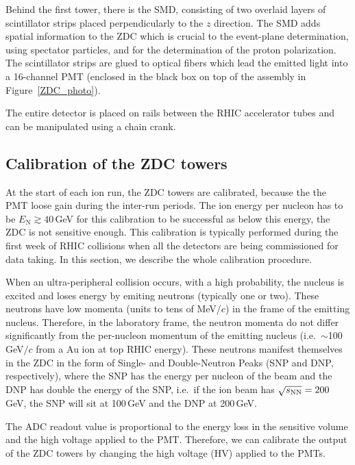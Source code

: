 Behind the first tower, there is the SMD, consisting of two overlaid layers of scintillator strips placed perpendicularly to the $z$ direction. The SMD adds spatial information to the ZDC which is crucial to the event-plane determination, using spectator particles, and for the determination of the proton polarization\@. The scintillator strips are glued to optical fibers which lead the emitted light into a 16-channel PMT (enclosed in the black box on top of the assembly in Figure~\ref{ZDC_photo})\@.

The entire detector is placed on rails between the RHIC accelerator tubes and can be manipulated using a chain crank.

\subsection{Calibration of the ZDC towers\label{ZDCcalibration}}
At the start of each ion run, the ZDC towers are calibrated, because the the PMT loose gain during the inter-run periods. The ion energy per nucleon has to be $E_\mathrm{N}\gtrsim40\,$GeV for this calibration to be successful as below this energy, the ZDC is not sensitive enough\@. This calibration is typically performed during the first week of RHIC collisions when all the detectors are being commissioned for data taking. In this section, we describe the whole calibration procedure.

When an ultra-peripheral
collision occurs, with a high probability, the nucleus is excited and loses energy by emiting neutrons
(typically one or two). These neutrons have low momenta (units to tens of MeV/$c$) in the frame of the emitting nucleus. Therefore, in the laboratory frame, the neutron momenta do not differ significantly from the per-nucleon momentum of the emitting nucleus (i.e.\ $\sim$100$\,$GeV$/c$ from a Au ion at top RHIC energy). These neutrons manifest themselves in the ZDC in the form of Single- and Double-Neutron Peaks
(SNP and DNP, respectively),
where the SNP has the energy per nucleon of the beam and the DNP has double the energy of the SNP, i.e.\ if
the ion beam has $\sqrt{s_\text{NN}} = 200\,$GeV, the SNP will sit at 100$\,$GeV and the DNP at 200$\,$GeV\@.

The ADC readout value is proportional to the energy loss in the sensitive volume and the high voltage applied to the PMT\@. Therefore, we can calibrate the output of the ZDC towers by changing the high voltage (HV) applied to the PMTs. 

